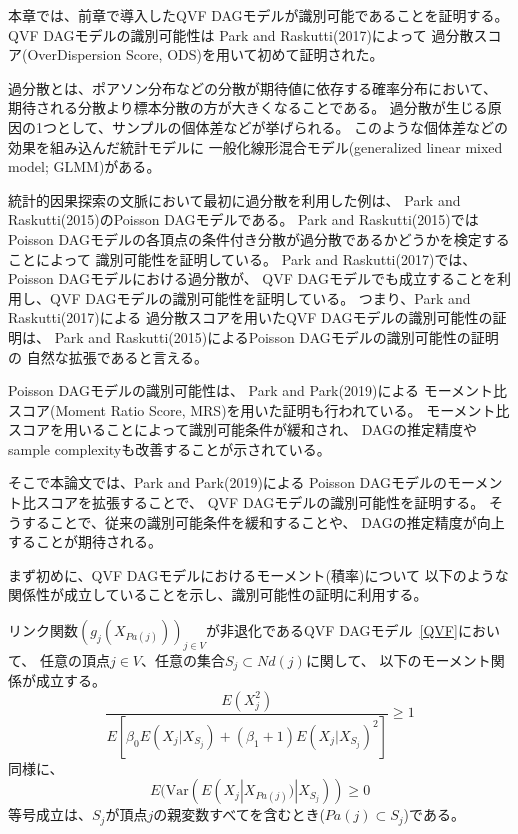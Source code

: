 

本章では、前章で導入したQVF DAGモデル\cite{Park2017-hw}が識別可能であることを証明する。
QVF DAGモデルの識別可能性は
Park and Raskutti(2017)\cite{Park2017-hw}によって
過分散スコア(OverDispersion Score, ODS)を用いて初めて証明された。

過分散とは、ポアソン分布などの分散が期待値に依存する確率分布において、
期待される分散より標本分散の方が大きくなることである。
過分散が生じる原因の1つとして、サンプルの個体差などが挙げられる。
このような個体差などの効果を組み込んだ統計モデルに
一般化線形混合モデル(generalized linear mixed model; GLMM)がある\cite{2012-iq}。

統計的因果探索の文脈において最初に過分散を利用した例は、
Park and Raskutti(2015)\cite{Park2015-tj}のPoisson DAGモデルである。
Park and Raskutti(2015)\cite{Park2015-tj}では
Poisson DAGモデルの各頂点の条件付き分散が過分散であるかどうかを検定することによって
識別可能性を証明している。
Park and Raskutti(2017)\cite{Park2017-hw}では、
Poisson DAGモデルにおける過分散が、
QVF DAGモデルでも成立することを利用し、QVF DAGモデルの識別可能性を証明している。
つまり、Park and Raskutti(2017)\cite{Park2017-hw}による
過分散スコアを用いたQVF DAGモデルの識別可能性の証明は、
Park and Raskutti(2015)\cite{Park2015-tj}によるPoisson DAGモデルの識別可能性の証明の
自然な拡張であると言える。

Poisson DAGモデルの識別可能性は、
Park and Park(2019)\cite{Park2019-qy}による
モーメント比スコア(Moment Ratio Score, MRS)を用いた証明も行われている。
モーメント比スコアを用いることによって識別可能条件が緩和され、
DAGの推定精度やsample complexityも改善することが示されている\cite{Park2019-qy}。

そこで本論文では、Park and Park(2019)\cite{Park2019-qy}による
Poisson DAGモデルのモーメント比スコアを拡張することで、
QVF DAGモデルの識別可能性を証明する。
そうすることで、従来の識別可能条件\cite{Park2017-hw}を緩和することや、
DAGの推定精度が向上することが期待される。

まず初めに、QVF DAGモデルにおけるモーメント(積率)について
以下のような関係性が成立していることを示し、識別可能性の証明に利用する。

\begin{prop} \label{prop:MRS}
  リンク関数$(g_j(X_{Pa(j)}))_{j \in V}$が非退化であるQVF DAGモデル~\eqref{QVF}において、
  任意の頂点$j \in V$、任意の集合$S_j \subset \mathit{Nd}(j)$に関して、
  以下のモーメント関係が成立する。
  \begin{equation}
    \frac{E(X_j^2)}
    {E \left[ \beta_0 E(X_j | X_{S_j}) + (\beta_1 + 1)E(X_j | X_{S_j})^2 \right]}
    \geq 1
    \label{eq:MRS}
  \end{equation}
  同様に、
  \begin{equation}
    \label{eq:MRS_2}
    E(\mathrm{Var}( E(X_j | X_{Pa(j)}) | X_{S_j} )) \geq 0
  \end{equation}
  等号成立は、$S_j$が頂点$j$の親変数すべてを含むとき($Pa(j)\subset S_j$)である。
\end{prop}


